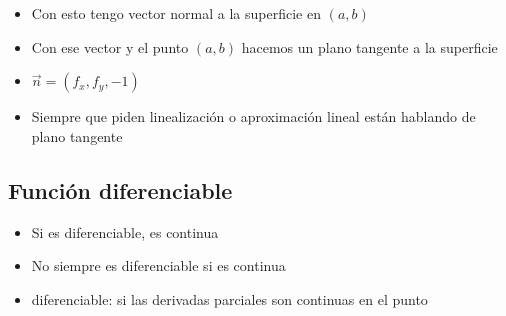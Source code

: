 \begin{itemize}
    \item Con esto tengo vector normal a la superficie en \((a,b)\)
    \item Con ese vector y el punto \((a,b)\) hacemos un plano tangente a la 
    superficie
    \item \( \vec{n} = (f_x, f_y, -1)\)
    \item Siempre que piden linealización o aproximación lineal están hablando de
    plano tangente
\end{itemize}

\subsection{Función diferenciable}
\begin{itemize}
    \item Si es diferenciable, es continua 
    \item No siempre es diferenciable si es continua
    \item diferenciable: si las derivadas parciales son continuas en el punto
\end{itemize}